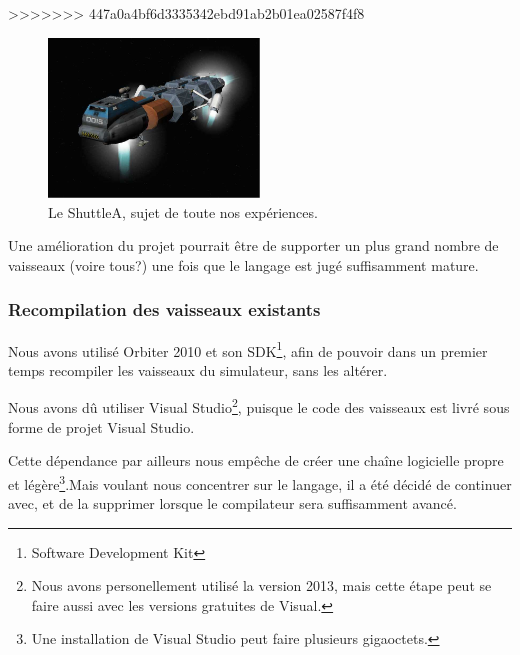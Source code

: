 \documentclass[a4paper,11pt]{article}
\begin{document}
>>>>>>> 447a0a4bf6d3335342ebd91ab2b01ea02587f4f8
        \begin{figure}[!h]
            \begin{center}
                \includegraphics[width=0.5\textwidth]{img/shuttleA.png}
                \caption{Le ShuttleA, sujet de toute nos expériences.}
            \end{center}
        \end{figure}
        
        Une amélioration du projet pourrait être de supporter un plus grand nombre de vaisseaux (voire tous?) une fois que le langage est jugé suffisamment mature.



    \subsubsection{Recompilation des vaisseaux existants}
        Nous avons utilisé Orbiter 2010 et son SDK\footnote{Software Development Kit}, afin de pouvoir dans un premier temps recompiler les vaisseaux du simulateur, sans les altérer.

        Nous avons dû utiliser Visual Studio\footnote{Nous avons personellement utilisé la version 2013, mais cette étape peut se faire aussi avec les versions gratuites de Visual.}, puisque le code des vaisseaux est livré sous forme de projet Visual Studio. 
        
        Cette dépendance par ailleurs nous empêche de créer une chaîne logicielle propre et légère\footnote{Une installation de Visual Studio peut faire plusieurs gigaoctets.}.Mais voulant nous concentrer sur le langage, il a été décidé de continuer avec, et de la supprimer lorsque le compilateur sera suffisamment avancé.

\end{document}
